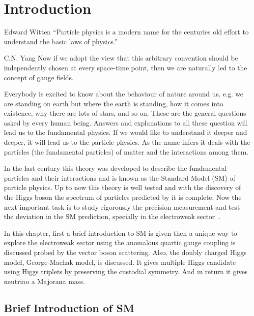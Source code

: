 \chapter{Introduction}

\begin{chapquote}
{Edward Witten}
``Particle physics is a modern name for the centuries old effort to understand the basic laws of physics.''
\end{chapquote}

\begin{chapquote}
{C.N. Yang}
Now if we adopt the view that this arbitrary convention should be independently chosen at every space-time point, then we are naturally led to the concept of gauge fields.
\end{chapquote}

%
%

Everybody is excited to know about the behaviour of nature around us, e.g. we are standing on earth but where the earth is standing, how it comes into existence, why there are lots of stars, and so on.
These are the general questions asked by every human being. Answers and explanations to all these question will lead us to the fundamental physics.
If we would like to understand it deeper and deeper, it will lead us to the particle physics.
As the name infers it deals with the particles (the fundamental particles) of matter and the interactions among them.

In the last century this theory was developed to describe the fundamental particles and their interactions and is known as the Standard Model (SM) of particle physics.
Up to now this theory is well tested and with the discovery of the Higgs boson the spectrum of particles predicted by it is complete.
Now the next important task is to study rigorously the precision measurement and test the deviation in the SM prediction, specially in the electroweak sector~\cite{Baak2013}.

In this chapter, first a brief introduction to SM is given then a unique way to explore the electroweak sector using the anomalous quartic gauge coupling is discussed probed by the vector boson scattering. Also, the doubly charged Higgs model, George-Machak model, is discussed. It gives multiple Higgs candidate using Higgs triplets by preserving the custodial symmetry. And in return it gives neutrino a Majorana mass.


\section{Brief Introduction of SM} %
\label{sec:brief_introduction_of_sm}

